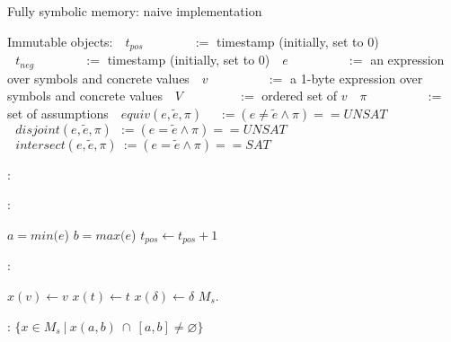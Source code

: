 \documentclass{article}
\let\emptyset\varnothing
\begin{document}
\begin{algorithm}
  \normalsize

  \caption{Fully symbolic memory: naive implementation}
  \begin{algorithmic}
  	\State Immutable objects:
  	\State $~~~t_{pos}~~~~~~~~~~~~~~~\,\,~:=$ timestamp (initially, set to 0)
  	\State $~~~t_{neg}~~~~~~~~~~~~~~~\,\,~:=$ timestamp (initially, set to 0)
  	\State $~~~e~~~~~~~~~~~~~~~~~~~\,~:=$ an expression over symbols and concrete values
  	\State $~~~v~~~~~~~~~~~~~~~~~~~~\,:=$ a 1-byte expression over symbols and concrete values
  	\State $~~~V~~~~~~~~~~~~~~~~~~~\,:=$ ordered set of $v$
  	\State $~~~\pi~~~~~~~~~~~~~~~~~~~~\,:=$ set of assumptions
  	\State $~~~equiv(e, \widetilde{e}, \pi)~~~~~\,:= (e \not = \widetilde{e} \wedge \pi) == UNSAT$ 
  	\State $~~~disjoint(e, \widetilde{e}, \pi)~~:=  (e = \widetilde{e} \wedge \pi) == UNSAT$ 
  	\State $~~~intersect(e, \widetilde{e}, \pi)~:=  (e = \widetilde{e} \wedge \pi) == SAT$ 

  \end{algorithmic}

  \bigskip
  
  \begin{algorithmic}[1]
	:
			\State {}
		\EndFor
	\EndFunction
  \end{algorithmic}

  \bigskip

  \begin{algorithmic}[1]
	:
		
		\State $a = min(e$)
		\State $b = max(e$)
		\State $t_{pos} \leftarrow t_{pos} + 1$
		\State {}

	\EndFunction
  \end{algorithmic}

  \bigskip

  \begin{algorithmic}[1]
	:
		
				\State $x(v) \leftarrow v$
				\State $x(t) \leftarrow t$
				\State $x(\delta) \leftarrow \delta$
				\State \Return
			\EndIf
		\EndFor
		\State $M_s.$
	\EndFunction
  \end{algorithmic}

  \bigskip

  \begin{algorithmic}[1]
	:
		\State \Return $\{x \in M_s~|~x(a,b)~\cap~[a, b] \neq \emptyset\}$
	\EndFunction
  \end{algorithmic}

\end{algorithm}
  
\end{document}
